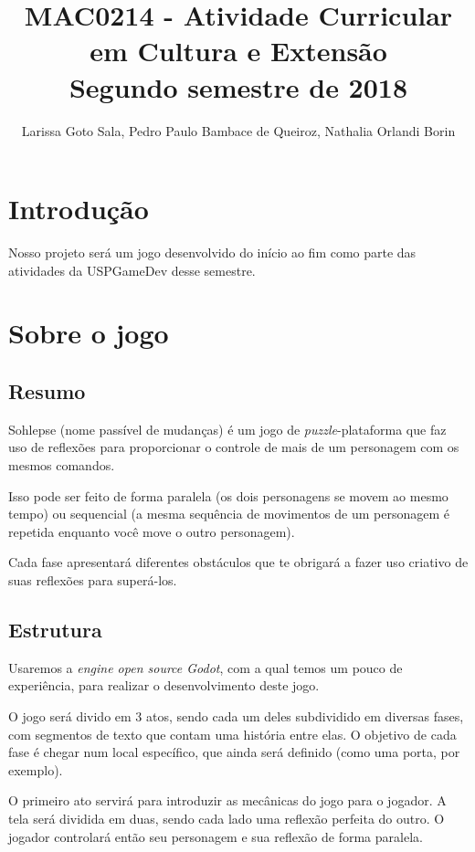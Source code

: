 \documentclass[a4paper, 11pt]{article}
\title{\textbf{MAC0214 - Atividade Curricular em Cultura e Extensão} \\ \small{Segundo semestre de 2018}}
\author{Larissa Goto Sala, Pedro Paulo Bambace de Queiroz, Nathalia Orlandi Borin}
\begin{document}
\maketitle

\newpage

\newpage

\section{Introdução}
	
	Nosso projeto será um jogo desenvolvido do início ao fim como parte das atividades da USPGameDev
	desse semestre.

\section{Sobre o jogo}
\subsection{Resumo}

	Sohlepse (nome passível de mudanças) é um jogo de \textit{puzzle}-plataforma que faz uso
 de reflexões para proporcionar o controle de mais de um personagem com os mesmos comandos.

 	Isso pode ser feito de forma paralela (os dois personagens se movem ao mesmo tempo) ou
 sequencial (a mesma sequência de movimentos de um personagem é repetida enquanto você
 move o outro personagem).

 	Cada fase apresentará diferentes obstáculos que te obrigará a fazer uso criativo de suas
 reflexões para superá-los.

\subsection{Estrutura}
	Usaremos a \textit{engine open source Godot}, com a qual temos um pouco de experiência, para realizar o desenvolvimento deste jogo.

	O jogo será divido em 3 atos, sendo cada um deles subdividido em diversas fases, com segmentos de texto que contam
uma história entre elas. O objetivo de cada fase é chegar num local específico, que ainda será definido (como uma porta,
por exemplo).

	O primeiro ato servirá para introduzir as mecânicas do jogo para o jogador. A tela será dividida em duas, sendo
cada lado uma reflexão perfeita do outro. O jogador controlará então seu personagem e sua reflexão de forma 
paralela.
\end{document}
